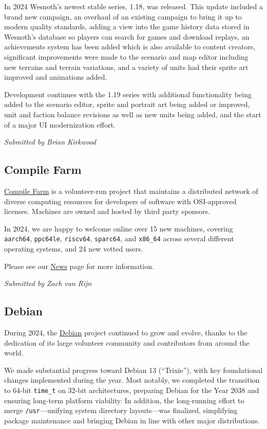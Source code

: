 \documentclass[a4paper]{report}
\begin{document}
In 2024 Wesnoth's newest stable series, 1.18, was released. This update included a brand new campaign, an overhaul of an existing campaign to bring it up to modern quality standards, adding a view into the game history data stored in Wesnoth's database so players can search for games and download replays, an achievements system has been added which is also available to content creators, significant improvements were made to the scenario and map editor including new terrains and terrain variations, and a variety of units had their sprite art improved and animations added.

Development continues with the 1.19 series with additional functionality being added to the scenario editor, sprite and portrait art being added or improved, unit and faction balance revisions as well as new units being added, and the start of a major UI modernization effort.

{\em Submitted by Brian Kirkwood}

\subsection{Compile Farm}

\href{https://portal.cfarm.net/}{Compile Farm} is a volunteer-run project that maintains a distributed network of diverse computing resources for developers of software with OSI-approved licenses. Machines are owned and hosted by third party sponsors.

In 2024, we are happy to welcome online over 15 new machines, covering {\tt aarch64}, {\tt ppc64le}, {\tt riscv64}, {\tt sparc64}, and {\tt x86\_64} across several different operating systems, and 24 new vetted users.

Please see our \href{https://portal.cfarm.net/news/}{News} page for more information.

{\em Submitted by Zach van Rijn} 

\subsection{Debian}

During 2024, the \href{https://www.debian.org/}{Debian} project continued to grow and evolve, thanks to the dedication of its large volunteer community and contributors from around the world.

We made substantial progress toward Debian 13 (``Trixie''), with key foundational changes implemented during the year. Most notably, we completed the transition to 64-bit \texttt{time\_t} on 32-bit architectures, preparing Debian for the Year 2038 and ensuring long-term platform viability. In addition, the long-running effort to merge \texttt{/usr}—unifying system directory layouts—was finalized, simplifying package maintenance and bringing Debian in line with other major distributions.
\end{document}

